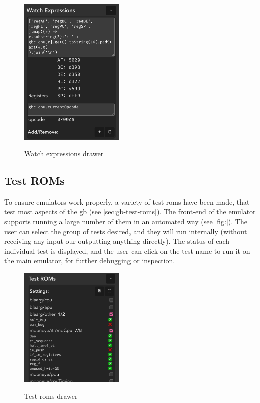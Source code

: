 \documentclass[11pt]{report}
\begin{document}
\begin{figure}[h]
    \centering
    \includegraphics[width=5cm]{images/watch-expressions}\\
    \caption{Watch expressions drawer}
    \label{fig:watch-expressions}
\end{figure}

\subsection{Test ROMs}

To ensure emulators work properly, a variety of test \glspl{rom} have been made, that test most aspects of the \gls{gb} (see \ref{sec:gb-test-roms}). The front-end of the emulator supports running a large number of them in an automated way (see \ref{fig:}). The user can select the group of tests desired, and they will run internally (without receiving any input our outputting anything directly). The status of each individual test is displayed, and the user can click on the test name to run it on the main emulator, for further debugging or inspection.

\begin{figure}[h]
    \centering
    \includegraphics[width=5cm]{images/test-roms}\\
    \caption{Test \glspl{rom} drawer}
    \label{fig:watch-expressions}
\end{figure}
\end{document}
